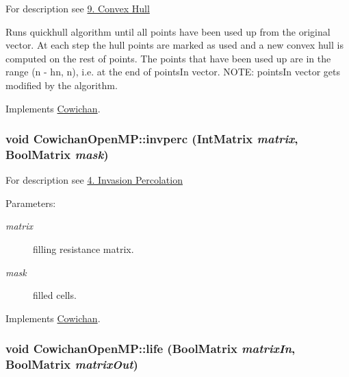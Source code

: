 For description see \hyperlink{index_hull_sec}{9. Convex Hull}

Runs quickhull algorithm until all points have been used up from the original vector. At each step the hull points are marked as used and a new convex hull is computed on the rest of points. The points that have been used up are in the range (n - hn, n), i.e. at the end of pointsIn vector. NOTE: pointsIn vector gets modified by the algorithm. 

Implements \hyperlink{class_cowichan_0c6b68ae3c059b66893405f8530a2e0a}{Cowichan}.\hypertarget{class_cowichan_open_m_p_4824c6b8509b5da835fbc5f64eb3e063}{
\subsubsection[{invperc}]{\setlength{\rightskip}{0pt plus 5cm}void CowichanOpenMP::invperc ({\bf IntMatrix} {\em matrix}, \/  {\bf BoolMatrix} {\em mask})}}
\label{class_cowichan_open_m_p_4824c6b8509b5da835fbc5f64eb3e063}


For description see \hyperlink{index_invperc_sec}{4. Invasion Percolation} \begin{Desc}
\item[Parameters:]
\begin{description}
\item[{\em matrix}]filling resistance matrix. \item[{\em mask}]filled cells. \end{description}
\end{Desc}


Implements \hyperlink{class_cowichan_ea126792a31e54a8722663b7ea768955}{Cowichan}.\hypertarget{class_cowichan_open_m_p_d24f3ef01289b8f1bd7b864f585daa62}{
\subsubsection[{life}]{\setlength{\rightskip}{0pt plus 5cm}void CowichanOpenMP::life ({\bf BoolMatrix} {\em matrixIn}, \/  {\bf BoolMatrix} {\em matrixOut})}}
\label{class_cowichan_open_m_p_d24f3ef01289b8f1bd7b864f585daa62}


